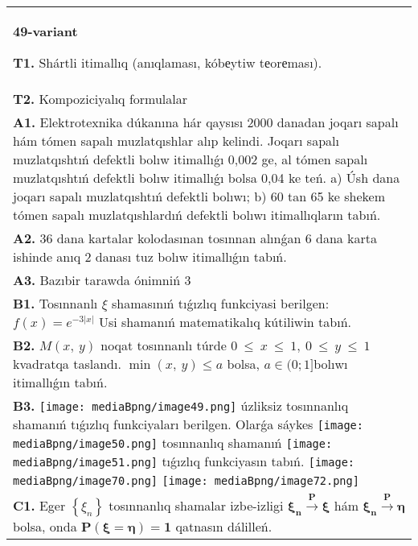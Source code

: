 \documentclass{article}
\begin{document}
\vspace{1cm}


\begin{tabular}{m{17cm}}
\textbf{49-variant}
\newline

\textbf{T1.} Shártli itimallıq (anıqlaması, kóbеytiw tеorеması).
 \\
\textbf{T2.} Kompoziciyalıq formulalar \\
\textbf{A1.} Elektrotexnika dúkanına hár qaysısı 2000 danadan joqarı sapalı hám tómen sapalı muzlatqıshlar alıp kelindi. Joqarı sapalı muzlatqıshtıń defektli bolıw itimallıǵı 0,002 ge, al tómen sapalı muzlatqıshtıń defektli bolıw itimallıǵı bolsa 0,04 ke teń. a) Úsh dana joqarı sapalı muzlatqıshtıń defektli bolıwı; b) 60 tan 65 ke shekem tómen sapalı muzlatqıshlardıń defektli bolıwı itimallıqların tabıń.
 \\
\textbf{A2.} 36 dana kartalar kolodasınan tosınnan alınǵan 6 dana karta ishinde anıq 2 danası tuz bolıw itimallıǵın tabıń.
 \\
\textbf{A3.} Bazıbir tarawda ónimniń 3%
 \\
\textbf{B1.} Tosınnanlı $\xi$ shamasınıń tıǵızlıq funkciyasi berilgen: \(f(x) = e^{- 3|x|}\) Usi shamanıń matematikalıq kútiliwin tabıń.
 \\
\textbf{B2.} \(M(x,\ y)\) noqat tosınnanlı túrde \(0\  \leq \ x\  \leq \ 1,\ 0\  \leq \ y\  \leq \ 1\) kvadratqa taslandı. \(\min(x,\ y) \leq a\) bolsa, \(a \in (0;1\rbrack\)bolıwı itimallıǵın tabıń.
 \\
\textbf{B3.} \texttt{[image: mediaBpng/image49.png]} úzliksiz tosınnanlıq shamanıń tıǵızlıq funkciyaları berilgen. Olarǵa sáykes \texttt{[image: mediaBpng/image50.png]} tosınnanlıq shamanıń \texttt{[image: mediaBpng/image51.png]} tıǵızlıq funkciyasın tabıń. \texttt{[image: mediaBpng/image70.png]} \texttt{[image: mediaBpng/image72.png]}
 \\
\textbf{C1.} Eger \(\left\{ \xi_{n} \right\}\) tosınnanlıq shamalar izbe-izligi \(\mathbf{\xi}_{\mathbf{n}}\overset{\mathbf{P}}{\rightarrow}\mathbf{\xi}\) hám \(\mathbf{\xi}_{\mathbf{n}}\overset{\mathbf{P}}{\rightarrow}\mathbf{\eta}\) bolsa, onda \(\mathbf{P}\left( \mathbf{\xi = \eta} \right)\mathbf{=}\mathbf{1}\) qatnasın dálilleń.

\end{tabular}
\end{document}
